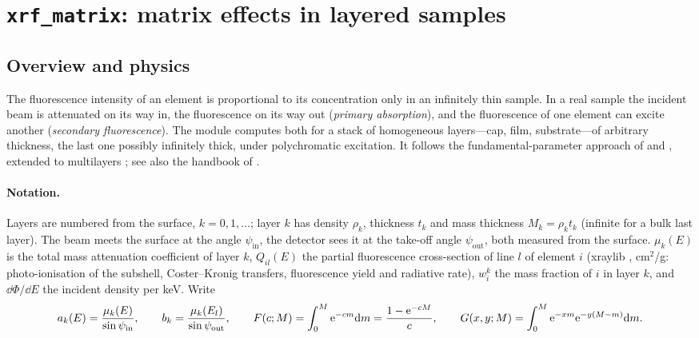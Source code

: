 \section{\texttt{xrf\_matrix}: matrix effects in layered samples}\label{sec:matrix}

\subsection{Overview and physics}

The fluorescence intensity of an element is proportional to its concentration only in an
infinitely thin sample. In a real sample the incident beam is attenuated on its way in, the
fluorescence on its way out (\emph{primary absorption}), and the fluorescence of one element
can excite another (\emph{secondary fluorescence}). The module computes both for a stack of
homogeneous layers---cap, film, substrate---of arbitrary thickness, the last one possibly
infinitely thick, under polychromatic excitation. It follows the fundamental-parameter
approach of \citet{Sherman1955} and \citet{Shiraiwa1966}, extended to multilayers
\citep{Mantler1986,deBoer1990}; see also the handbook of \citet{VanGrieken2002}.

\paragraph{Notation.} Layers are numbered from the surface, $k = 0,1,\dots$; layer $k$ has
density $\rho_k$, thickness $t_k$ and mass thickness $M_k = \rho_k t_k$ (infinite for a bulk
last layer). The beam meets the surface at the angle $\psi_\mathrm{in}$, the detector sees it
at the take-off angle $\psi_\mathrm{out}$, both measured from the surface. $\mu_k(E)$ is the
total mass attenuation coefficient of layer $k$, $Q_{il}(E)$ the partial fluorescence
cross-section of line $l$ of element $i$ (xraylib , cm$^2$/g:
photo-ionisation of the subshell, Coster--Kronig transfers, fluorescence yield and radiative
rate), $w_i^k$ the mass fraction of $i$ in layer $k$, and $\dd\Phi/\dd E$ the incident
density per keV. Write
\begin{equation}
  a_k(E) = \frac{\mu_k(E)}{\sin\psi_\mathrm{in}}, \qquad
  b_k = \frac{\mu_k(E_l)}{\sin\psi_\mathrm{out}}, \qquad
  F(c;M) = \int_0^M \mathrm{e}^{-cm}\mathrm{d} m = \frac{1-\mathrm{e}^{-cM}}{c}, \qquad
  G(x,y;M) = \int_0^M \mathrm{e}^{-xm}\mathrm{e}^{-y(M-m)}\mathrm{d} m .
\end{equation}

